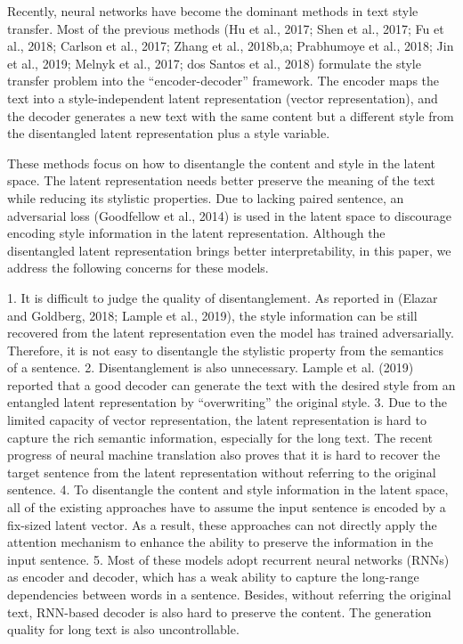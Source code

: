 \documentclass{article}
\begin{document}
Recently, neural networks have become the dominant methods in text style transfer. Most of the previous methods (Hu et al., 2017; Shen et al., 2017; Fu et al., 2018; Carlson et al., 2017; Zhang et al., 2018b,a; Prabhumoye et al., 2018; Jin et al., 2019; Melnyk et al., 2017; dos Santos et al., 2018) formulate the style transfer problem into the “encoder-decoder” framework. The encoder maps the text into a style-independent latent representation (vector representation), and the decoder generates a new text with the same content but a different style from the disentangled latent representation plus a style variable.

These methods focus on how to disentangle the content and style in the latent space. The latent representation needs better preserve the meaning of the text while reducing its stylistic properties. Due to lacking paired sentence, an adversarial loss (Goodfellow et al., 2014) is used in the latent space to discourage encoding style information in the latent representation. Although the disentangled latent representation brings better interpretability, in this paper, we address the following concerns for these models.

1. It is difficult to judge the quality of disentanglement. As reported in (Elazar and Goldberg, 2018; Lample et al., 2019), the style information can be still recovered from the latent representation even the model has trained adversarially. Therefore, it is not easy to disentangle the stylistic property from the semantics of a sentence.
2. Disentanglement is also unnecessary. Lample et al. (2019) reported that a good decoder can generate the text with the desired style from an entangled latent representation by “overwriting” the original style.
3. Due to the limited capacity of vector representation, the latent representation is hard to capture the rich semantic information, especially for the long text. The recent progress of neural machine translation also proves that it is hard to recover the target sentence from the latent representation without referring to the original sentence.
4. To disentangle the content and style information in the latent space, all of the existing approaches have to assume the input sentence is encoded by a fix-sized latent vector. As a result, these approaches can not directly apply the attention mechanism to enhance the ability to preserve the information in the input sentence.
5. Most of these models adopt recurrent neural networks (RNNs) as encoder and decoder, which has a weak ability to capture the long-range dependencies between words in a sentence. Besides, without referring the original text, RNN-based decoder is also hard to preserve the content. The generation quality for long text is also uncontrollable.
\end{document}
